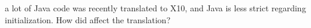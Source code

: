 a lot of Java code was recently translated to X10, and Java is less strict regarding initialization. How did affect the translation?
